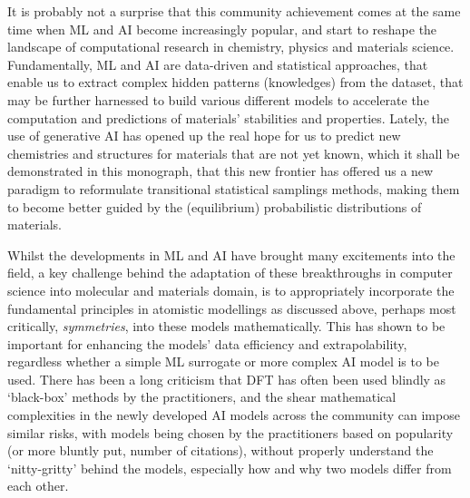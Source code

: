 It is probably not a surprise that this community achievement comes at the same time when ML and AI become increasingly popular, and start to reshape the landscape of computational research in chemistry, physics and materials science. Fundamentally, ML and AI are data-driven and statistical approaches, that enable us to extract complex hidden patterns (knowledges) from the dataset,\cite{glielmo2021unsupervised} that may be further harnessed to build various different models\cite{deringer2021gaussian,behler2021four,duval2023hitchhiker} to accelerate the computation and predictions of materials' stabilities and properties. Lately,  the use of generative AI\cite{zeni2025generative} has opened up the real hope for us to predict new chemistries and structures for materials that are not yet known, which it shall be demonstrated in this monograph, that this new frontier has offered us a new paradigm to reformulate transitional statistical samplings methods, making them to become better guided by the (equilibrium) probabilistic distributions of materials.

Whilst the developments in ML and  AI have brought many excitements into the field, a key challenge behind the adaptation of these breakthroughs in computer science into molecular and materials domain, is to appropriately incorporate the fundamental principles in atomistic modellings as discussed above, perhaps most critically, \emph{symmetries}, into these models mathematically.\cite{bartok2013representing,musil2021physics,grisafi2018symmetry,duval2023hitchhiker,nigam2022unified} This has shown to be important for enhancing the models' data efficiency and extrapolability, regardless whether a simple ML surrogate or more complex AI model is to be used. There has been a long criticism that DFT has often been used blindly as `black-box' methods by the practitioners,\cite{kruse2012standard} and the shear mathematical complexities in the newly developed AI models across the community can impose similar risks, with models being chosen by the practitioners based on popularity (or more bluntly put, number of citations), without properly understand the `nitty-gritty' behind the models, especially how and why two models differ from each other.

